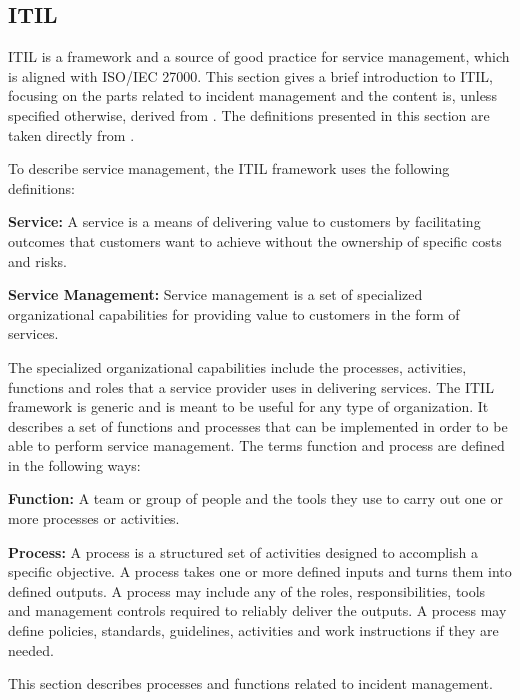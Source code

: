 \subsection{ITIL}
\label{section:ITIL}
\ac{ITIL} is a framework and a source of good practice for service management, which is aligned with \acs{ISO}/\acs{IEC} 27000. This section gives a brief introduction to \ac{ITIL}, focusing on the parts related to incident management and the content is, unless specified otherwise, derived from \cite{itilbok}. The definitions presented in this section are taken directly from \cite{itilbok}.

To describe service management, the \ac{ITIL} framework uses the following definitions:

\textbf{Service:} A service is a means of delivering value to customers by facilitating outcomes that customers want to achieve without the ownership of specific costs and risks.

\textbf{Service Management:} Service management is a set of specialized organizational capabilities for providing value to customers in the form of services.

The specialized organizational capabilities include the processes, activities, functions and roles that a service provider uses in delivering services. The \ac{ITIL} framework is generic and is meant to be useful for any type of organization. It describes a set of functions and processes that can be implemented in order to be able to perform service management. The terms function and process are defined in the following ways:

\textbf{Function:} A team or group of people and the tools they use to carry out one or more processes or activities.

\textbf{Process:} A process is a structured set of activities designed to accomplish a specific objective. A process takes one or more defined inputs and turns them into defined outputs. A process may include any of the roles, responsibilities, tools and management controls required to reliably deliver the outputs. A process may define policies, standards, guidelines, activities and work instructions if they are needed.


This section describes processes and functions related to incident management.

